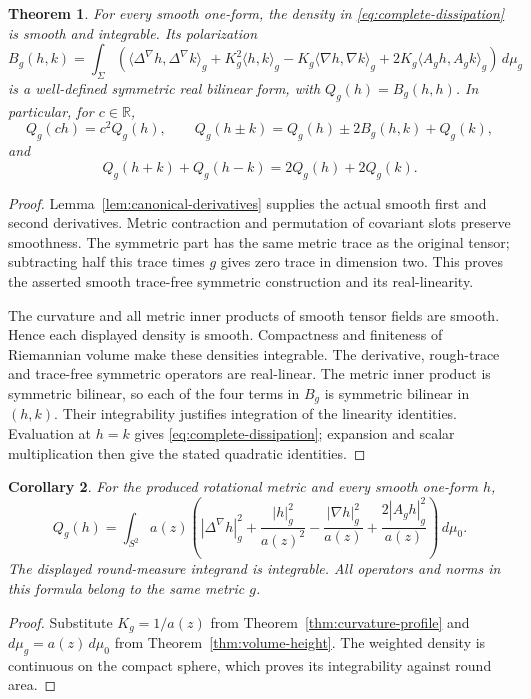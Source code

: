 \documentclass[11pt]{article}
\newtheorem{theorem}{Theorem}[section]
\newtheorem{corollary}[theorem]{Corollary}
\newcommand{\R}{\mathbb R}
\begin{document}
\begin{theorem}\label{thm:dissipation-quadratic}
For every smooth one-form, the density in \eqref{eq:complete-dissipation}
is smooth and integrable. Its polarization
\[
 B_g(h,k)=\int_\Sigma
 \left(
 \langle\Delta^\nabla h,\Delta^\nabla k\rangle_g
 +K_g^2\langle h,k\rangle_g
 -K_g\langle\nabla h,\nabla k\rangle_g
 +2K_g\langle A_g h,A_g k\rangle_g
 \right)\,d\mu_g
\]
is a well-defined symmetric real bilinear form, with $Q_g(h)=B_g(h,h)$.
In particular, for $c\in\R$,
\[
 Q_g(ch)=c^2Q_g(h),\qquad
 Q_g(h\pm k)=Q_g(h)\pm2B_g(h,k)+Q_g(k),
\]
and
\[
 Q_g(h+k)+Q_g(h-k)=2Q_g(h)+2Q_g(k).
\]
\end{theorem}

\begin{proof}
Lemma~\ref{lem:canonical-derivatives} supplies the actual smooth first and
second derivatives. Metric contraction and permutation of covariant slots
preserve smoothness. The symmetric part has the same metric trace as the
original tensor; subtracting half this trace times $g$ gives zero trace in
dimension two. This proves the asserted smooth trace-free symmetric
construction and its real-linearity.

The curvature and all metric inner products of smooth tensor fields are
smooth. Hence each displayed density is smooth. Compactness and finiteness
of Riemannian volume make these densities integrable. The derivative,
rough-trace and trace-free symmetric operators are real-linear.
The metric inner product is symmetric bilinear, so each of the four
terms in $B_g$ is symmetric bilinear in $(h,k)$. Their integrability
justifies integration of the linearity identities. Evaluation at $h=k$
gives \eqref{eq:complete-dissipation}; expansion and scalar multiplication
then give the stated quadratic identities.
\end{proof}

\begin{corollary}\label{cor:profile-dissipation}
For the produced rotational metric and every smooth one-form $h$,
\[
 Q_g(h)=\int_{S^2}a(z)
 \left(
 |\Delta^\nabla h|_g^2+\frac{|h|_g^2}{a(z)^2}
 -\frac{|\nabla h|_g^2}{a(z)}
 +\frac{2|A_g h|_g^2}{a(z)}
 \right)\,d\mu_0.
\]
The displayed round-measure integrand is integrable. All operators and
norms in this formula belong to the same metric $g$.
\end{corollary}

\begin{proof}
Substitute $K_g=1/a(z)$ from Theorem~\ref{thm:curvature-profile} and
$d\mu_g=a(z)\,d\mu_0$ from Theorem~\ref{thm:volume-height}.
The weighted density is continuous on the compact sphere, which proves
its integrability against round area.
\end{proof}
\end{document}
